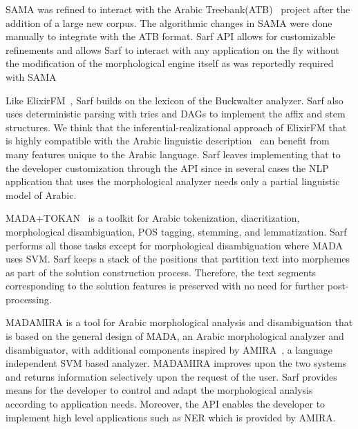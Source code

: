 SAMA was refined to interact with the Arabic Treebank(ATB)~\citep{Maamouri:04}  %
project after the addition of a large new corpus. 
The algorithmic changes in SAMA were done manually 
to integrate with the ATB format. 
Sarf API allows for customizable refinements 
and allows Sarf to interact with any 
application on the fly
without the modification of the morphological engine itself
as was reportedly required with SAMA~\citep{Maamouri:10} 

Like ElixirFM~\citep{Otakar:07}, Sarf builds on the lexicon
of the Buckwalter analyzer. 
Sarf also uses deterministic parsing with tries and DAGs
to implement the affix and stem structures. 
We think that the inferential-realizational approach 
of ElixirFM that is highly compatible with the 
Arabic linguistic description~\citep*{Badawi:04}
can benefit from many features unique to the Arabic language.
Sarf leaves implementing that to the developer customization 
through the API since in several cases the NLP application that uses the morphological analyzer
needs only a partial linguistic model of Arabic.

MADA+TOKAN~\citep{Habash:09} is a toolkit for Arabic tokenization, diacritization, 
morphological disambiguation, POS tagging, stemming, and lemmatization. 
Sarf performs all those tasks except for morphological disambiguation 
where MADA uses SVM.
Sarf keeps a stack of the positions that partition text into morphemes 
as part of the solution construction process. 
Therefore, the text segments corresponding to the solution features is preserved 
with no need for further post-processing. 


MADAMIRA is a tool for Arabic morphological analysis and disambiguation 
that is based on the general design of MADA, 
an Arabic morphological analyzer and disambiguator, with additional components 
inspired by AMIRA~\citep{pasha2014madamira}, a language independent SVM based analyzer. 
MADAMIRA improves upon the two systems and returns information selectively 
upon the request of the user. 
Sarf provides means for the developer to control and adapt 
the morphological analysis according to application needs. 
Moreover, the API enables the developer to implement high level 
applications such as NER which is provided by AMIRA.


